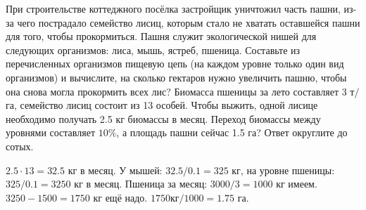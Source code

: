 
При
строительстве коттеджного посёлка застройщик уничтожил часть пашни, из-за чего
пострадало семейство лисиц, которым стало не хватать оставшейся пашни для того,
чтобы прокормиться. Пашня служит экологической нишей для следующих организмов:
лиса, мышь, ястреб, пшеница. Составьте из перечисленных организмов пищевую цепь (на каждом уровне только один вид организмов) и вычислите, на сколько гектаров нужно увеличить пашню, чтобы она снова могла
прокормить всех лис? Биомасса пшеницы за лето составляет 3 т/га, семейство лисиц
состоит из 13  особей. Чтобы выжить, одной лисице необходимо получать 2.5 кг
биомассы в месяц. Переход биомассы между уровнями составляет $10\%$, а площадь
пашни сейчас 1.5 га? Ответ округлите до сотых.

\solutionSection

$2.5 \cdot 13=32.5$ кг в месяц. У мышей: $32.5/0.1 = 325$ кг, на уровне пшеницы: $325/0.1 = 3250$ кг в месяц. 
Пшеница за месяц: $3000/3=1000$ кг имеем.\\ $3250-1500 = 1750$ кг ещё надо. $1750кг/1000=1.75$ га.

